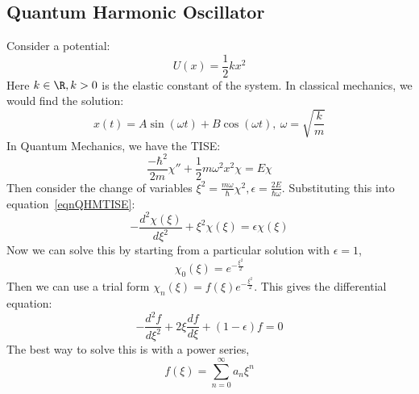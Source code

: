 \documentclass[../Main.tex]{subfiles}
\begin{document}
\subsection{Quantum Harmonic Oscillator}
Consider a potential:
\begin{equation*}
    U(x) = \frac12 k x^2
\end{equation*}
Here $k \in \R, k > 0$ is the elastic constant of the system.
In classical mechanics, we would find the solution:
\begin{equation*}
    x(t) = A\sin(\omega t) + B\cos(\omega t),~\omega = \sqrt{\frac{k}{m}}
\end{equation*}
In Quantum Mechanics, we have the TISE:
\begin{equation}
    \frac{-\hbar^2}{2m}\chi'' + \frac{1}{2}m\omega^2 x^2 \chi = E\chi
    \label{eqnQHMTISE}
\end{equation}
Then consider the change of variables $\xi^2 = \frac{m\omega}{\hbar}\chi^2, \epsilon = \frac{2E}{\hbar \omega}$. Substituting this into equation~\ref{eqnQHMTISE}:
\begin{equation}
    -\frac{d^{2}\chi(\xi)}{d\xi^{2}} + \xi^2 \chi(\xi) = \epsilon\chi(\xi)
    \label{eqnQHMScaledTISE}
\end{equation}
Now we can solve this by starting from a particular solution with $\epsilon = 1$,
\begin{equation}
    \chi_0(\xi) = e^{-\frac{\xi^2}{2}}
    \label{eqnQHMPartSoln}
\end{equation}
Then we can use a trial form $\chi_n(\xi) = f(\xi) e^{-\frac{\xi^2}{2}}$. This gives the differential equation:
\begin{equation}
    -\frac{d^{2}f}{d\xi^{2}} + 2\xi \frac{df}{d\xi} + (1 - \epsilon)f = 0
    \label{eqnQHMTrialEquation}
\end{equation}
The best way to solve this is with a power series,
\begin{equation*}
    f(\xi) = \sum_{n=0}^{\infty} a_n \xi^n
\end{equation*}
\end{document}
